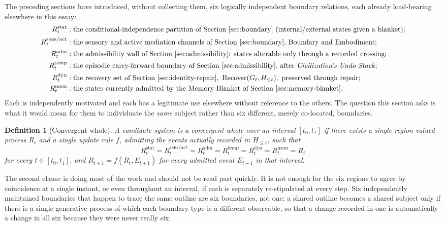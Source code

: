\documentclass[11pt]{article}
\newcommand{\Recover}{\operatorname{Recover}}
\newtheorem{definition}{Definition}
\begin{document}
The preceding sections have introduced, without collecting them, six logically independent boundary relations, each already load-bearing elsewhere in this essay:
\begin{align*}
R^{\mathrm{stat}}_t &: \text{the conditional-independence partition of Section~\ref{sec:boundary} (internal/external states given a blanket);}\\
R^{\mathrm{sens/act}}_t &: \text{the sensory and active mediation channels of Section~\ref{sec:boundary}, Boundary and Embodiment;}\\
R^{\mathrm{adm}}_t &: \text{the admissibility wall of Section~\ref{sec:admissibility}: states alterable only through a recorded crossing;}\\
R^{\mathrm{temp}}_t &: \text{the episodic carry-forward boundary of Section~\ref{sec:admissibility}, after \emph{Civilization's Undo Stack};}\\
R^{\mathrm{dyn}}_t &: \text{the recovery set of Section~\ref{sec:identity-repair}, } \Recover(G_t,H_{\leq t}), \text{ preserved through repair;}\\
R^{\mathrm{mem}}_t &: \text{the states currently admitted by the Memory Blanket of Section~\ref{sec:memory-blanket}.}
\end{align*}
Each is independently motivated and each has a legitimate use elsewhere without reference to the others. The question this section asks is what it would mean for them to individuate the \emph{same} subject rather than six different, merely co-located, boundaries.

\begin{definition}[Convergent whole]
A candidate system is a convergent whole over an interval $[t_0,t_1]$ if there exists a single region-valued process $R_t$ and a single update rule $f$, admitting the events actually recorded in $H_{\leq t}$, such that
\[
R^{\mathrm{stat}}_t = R^{\mathrm{sens/act}}_t = R^{\mathrm{adm}}_t = R^{\mathrm{temp}}_t = R^{\mathrm{dyn}}_t = R^{\mathrm{mem}}_t = R_t
\]
for every $t\in[t_0,t_1]$, and $R_{t+1}=f(R_t,E_{t+1})$ for every admitted event $E_{t+1}$ in that interval.
\end{definition}

The second clause is doing most of the work and should not be read past quickly. It is not enough for the six regions to agree by coincidence at a single instant, or even throughout an interval, if each is separately re-stipulated at every step. Six independently maintained boundaries that happen to trace the same outline are six boundaries, not one; a shared outline becomes a shared subject only if there is a single generative process of which each boundary type is a different observable, so that a change recorded in one is automatically a change in all six because they were never really six.
\end{document}
